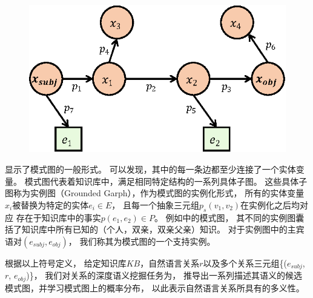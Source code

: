 \begin{figure}[ht]
    \centering
    \includegraphics[width=0.5\columnwidth]{figure/schema/problem.eps}
    \label{fig:schema-problem}
\end{figure}


显示了模式图的一般形式。
可以发现，其中的每一条边都至少连接了一个实体变量。
模式图代表着知识库中，满足相同特定结构的一系列具体子图。
这些具体子图称为实例图（Grounded Garph），作为模式图的实例化形式，
所有的实体变量$x_i$被替换为特定的实体$e_i \in E$，
且每一个抽象三元组$p_s(v_1, v_2)$在实例化之后均对应
存在于知识库中的事实$p(e_1, e_2) \in P$。
例如中的模式图，
其不同的实例图囊括了知识库中所有已知的（个人，双亲，双亲父亲）知识。
对于实例图中的主宾语对$(e_{subj}, e_{obj})$，
我们称其为模式图的一个支持实例。



根据以上符号定义，
给定知识库$KB$，自然语言关系$r$以及多个关系三元组\{($e_{subj}$, $r$, $e_{obj}$)\}，
我们对关系的深度语义挖掘任务为，
推导出一系列描述其语义的候选模式图，并学习模式图上的概率分布，
以此表示自然语言关系所具有的多义性。




